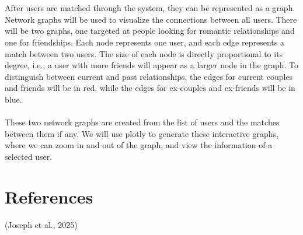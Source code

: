\documentclass[fontsize=11pt]{article}
\begin{document}
\\
\\
After users are matched through the system, they can be represented as a graph. Network graphs will be used to visualize the connections between all users. There will be two graphs, one targeted at people looking for romantic relationships and one for friendships. Each node represents one user, and each edge represents a match between two users. The size of each node is directly proportional to its degree, i.e., a user with more friends will appear as a larger node in the graph. To distinguish between current and past relationships, the edges for current couples and friends will be in red, while the edges for ex-couples and ex-friends will be in blue.
\\
\\
These two network graphs are created from the list of users and the matches between them if any. We will use plotly to generate these interactive graphs, where we can zoom in and out of the graph, and view the information of a selected user.

\section*{References}

(Joseph et al., 2025)

\end{document}

